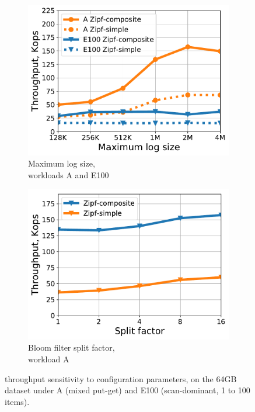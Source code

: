 \begin{figure}[htb]
\centering
\begin{subfigure}{0.48\linewidth}
\includegraphics[width=\textwidth]{figs/max_log_size_line.pdf}
\caption{Maximum log size,\\  workloads A and E100}
\label{fig:params:log}
\end{subfigure}
\begin{subfigure}{0.48\linewidth}
\includegraphics[width=\textwidth]{figs/Bloom_filter_line.pdf}
\caption{Bloom filter split factor,\\ workload A}
\label{fig:params:bf}
\end{subfigure}
\caption{{\sys\/ throughput sensitivity to configuration parameters, on the 64GB dataset under  A (mixed put-get) and 
E100 (scan-dominant, 1 to 100 items).}}
\label{fig:params}
\end{figure}

